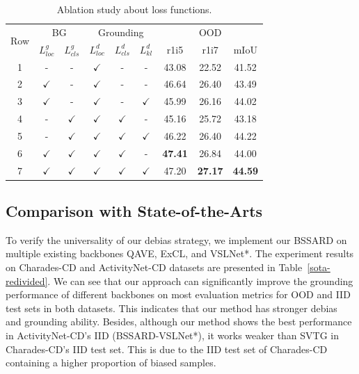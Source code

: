 \begin{table}[t]
	\centering
	\renewcommand{\arraystretch}{1}
	\setlength{\tabcolsep}{1mm}
	\begin{tabular}{c|cc|ccc|ccc}
		\toprule
		\multirow{2}{*}{Row}
		& \multicolumn{2}{c}{BG} & \multicolumn{3}{c}{Grounding} &
		\multicolumn{3}{c}{OOD}  \\
		& $L_{loc}^g$ & $L_{cls}^g$ & $L_{loc}^d$ & $L_{cls}^d$ & $L_{kl}^d$
		& r1i5 & r1i7 & mIoU \\
		\midrule
		1 & - & - & $\checkmark$ & - & - &
		43.08 & 22.52 & 41.52 \\
		2 & $\checkmark$ & - & $\checkmark$ & - & - &
		46.64 & 26.40 & 43.49 \\
		3 & $\checkmark$ & - & $\checkmark$ & - & $\checkmark$ &
		45.99 & 26.16 & 44.02 \\
		4 & - & $\checkmark$ & $\checkmark$ & $\checkmark$ & - &
		45.16 & 25.72 & 43.18 \\
		5 & - & $\checkmark$ & $\checkmark$ & $\checkmark$ & $\checkmark$ & 
		46.22 & 26.40 & 44.22 \\
		6 & $\checkmark$ & $\checkmark$ & $\checkmark$ & $\checkmark$ & - & 
		{\bf 47.41} & 26.84 & 44.00 \\
		7 & $\checkmark$ & $\checkmark$ & $\checkmark$ & $\checkmark$ & $\checkmark$ &
		47.20 & {\bf 27.17} & {\bf 44.59} \\
		\bottomrule
	\end{tabular}
	\caption{Ablation study about loss functions.}
	\label{loss term study}
\end{table}


\subsection{Comparison with State-of-the-Arts}

To verify the universality of our debias strategy, we implement our BSSARD on multiple existing backbones QAVE, ExCL, and VSLNet*. The experiment results on Charades-CD and ActivityNet-CD datasets are presented in Table~\ref{sota-redivided}. 
We can see that our approach can significantly improve the grounding performance of different backbones on most evaluation metrics for OOD and IID test sets in both datasets. This indicates that our method has stronger debias and grounding ability. 
Besides, although our method shows the best performance in ActivityNet-CD's IID (BSSARD-VSLNet*), it works weaker than SVTG in Charades-CD's IID test set. This is due to the IID test set of Charades-CD containing a higher proportion of biased samples. 


